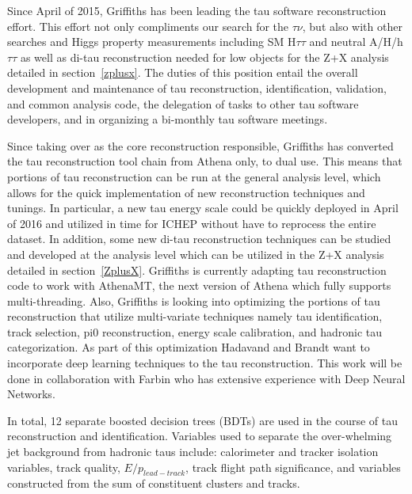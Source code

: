 \label{tau-reco}
Since April of 2015, Griffiths has been leading the tau software reconstruction effort.  This effort not only compliments our search for the \Hp \too $\tau \nu$, but also with other searches and Higgs property measurements 
including SM H\too $\tau\tau$ and neutral A/H/h \too $\tau\tau$ as well as di-tau reconstruction needed for low \pt objects for the Z+X analysis detailed in section~\ref{zplusx}.  
The duties of this position entail the overall development and maintenance of tau reconstruction, identification, validation, and common analysis code, the delegation 
of tasks to other tau software developers, and in organizing a bi-monthly tau software meetings.

Since taking over as the core reconstruction responsible, Griffiths has converted the tau reconstruction tool chain from Athena only, to dual use.  
This means that portions of tau reconstruction can be run at the general analysis level, which allows for the quick implementation of new reconstruction techniques and tunings.  
In particular, a new tau energy scale could be quickly deployed in April of 2016 and utilized in time for ICHEP without have to reprocess the entire dataset.  
In addition, some new di-tau reconstruction techniques can be studied and developed at the analysis level which can be utilized in the Z+X analysis detailed in section~\ref{ZplusX}.
Griffiths is currently adapting tau reconstruction code to work with AthenaMT, the next version of Athena which fully supports multi-threading. 
Also, Griffiths is looking into optimizing the portions of tau reconstruction that utilize multi-variate techniques  namely tau identification, track selection, pi0 reconstruction, energy scale calibration, and hadronic tau categorization.
As part of this optimization Hadavand and Brandt want to incorporate deep learning techniques to the tau reconstruction. This work will be done in collaboration with Farbin who has extensive experience with Deep Neural Networks.

In total, 12 separate boosted decision trees (BDTs) are used in the course of tau reconstruction and identification.  Variables used to separate the over-whelming jet background from hadronic taus include: calorimeter and tracker isolation variables, track quality, $E/p_{lead-track}$, track flight path significance, and variables constructed from the sum of constituent clusters and tracks.   
